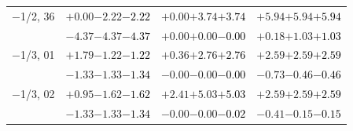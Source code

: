\documentclass[compress]{beamer}
\begin{document}
\begin{frame}
\begin{tabular}{r | c | c | c}
$-$1/2, 36 & $+0.00$\hspace{0.1 cm}$-2.22$\hspace{0.1 cm}\textcolor{black}{$-2.22$} & $+0.00$\hspace{0.1 cm}$+3.74$\hspace{0.1 cm}\textcolor{black}{$+3.74$} & $+5.94$\hspace{0.1 cm}$+5.94$\hspace{0.1 cm}\textcolor{black}{$+5.94$} \\
           & $-4.37$\hspace{0.1 cm}$-4.37$\hspace{0.1 cm}\textcolor{black}{$-4.37$} & $+0.00$\hspace{0.1 cm}$+0.00$\hspace{0.1 cm}\textcolor{black}{$-0.00$} & $+0.18$\hspace{0.1 cm}$+1.03$\hspace{0.1 cm}\textcolor{black}{$+1.03$} \\
$-$1/3, 01 & $+1.79$\hspace{0.1 cm}$-1.22$\hspace{0.1 cm}\textcolor{black}{$-1.22$} & $+0.36$\hspace{0.1 cm}$+2.76$\hspace{0.1 cm}\textcolor{black}{$+2.76$} & $+2.59$\hspace{0.1 cm}$+2.59$\hspace{0.1 cm}\textcolor{black}{$+2.59$} \\
           & $-1.33$\hspace{0.1 cm}$-1.33$\hspace{0.1 cm}\textcolor{black}{$-1.34$} & $-0.00$\hspace{0.1 cm}$-0.00$\hspace{0.1 cm}\textcolor{black}{$-0.00$} & $-0.73$\hspace{0.1 cm}$-0.46$\hspace{0.1 cm}\textcolor{black}{$-0.46$} \\
$-$1/3, 02 & $+0.95$\hspace{0.1 cm}$-1.62$\hspace{0.1 cm}\textcolor{black}{$-1.62$} & $+2.41$\hspace{0.1 cm}$+5.03$\hspace{0.1 cm}\textcolor{black}{$+5.03$} & $+2.59$\hspace{0.1 cm}$+2.59$\hspace{0.1 cm}\textcolor{black}{$+2.59$} \\
           & $-1.33$\hspace{0.1 cm}$-1.33$\hspace{0.1 cm}\textcolor{black}{$-1.34$} & $-0.00$\hspace{0.1 cm}$-0.00$\hspace{0.1 cm}\textcolor{black}{$-0.02$} & $-0.41$\hspace{0.1 cm}$-0.15$\hspace{0.1 cm}\textcolor{black}{$-0.15$} \\

\end{tabular}
\end{frame}
\end{document}
